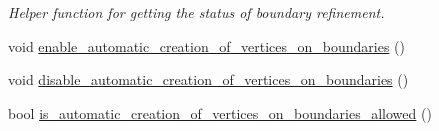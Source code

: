 \begin{DoxyCompactItemize}
$$\begin{DoxyCompactList}\small\item\em Helper function for getting the status of boundary refinement. \end{DoxyCompactList}\item 
void \hyperlink{classoomph_1_1TriangleMeshParameters_a6448159477b5b99adcb942c1cbf82a07}{enable\+\_\+automatic\+\_\+creation\+\_\+of\+\_\+vertices\+\_\+on\+\_\+boundaries} ()
\item 
void \hyperlink{classoomph_1_1TriangleMeshParameters_a5b233318ec4e4635d7b74c27d0c6287c}{disable\+\_\+automatic\+\_\+creation\+\_\+of\+\_\+vertices\+\_\+on\+\_\+boundaries} ()
\item 
bool \hyperlink{classoomph_1_1TriangleMeshParameters_a1c4b2e2d3d8831d46e42bd432fdcae32}{is\+\_\+automatic\+\_\+creation\+\_\+of\+\_\+vertices\+\_\+on\+\_\+boundaries\+\_\+allowed} ()
\end{DoxyCompactItemize}
